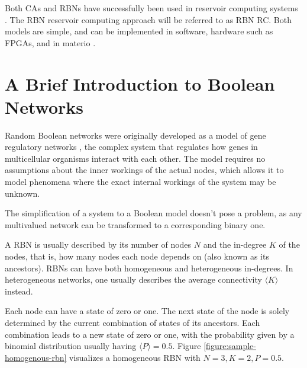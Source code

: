 Both CAs and RBNs have successfully been used in reservoir computing systems \cite{yilmaz2014reservoir} \cite{rbn-reservoir}.
The RBN reservoir computing approach will be referred to as RBN RC.
Both models are simple, and can be implemented in software,
hardware such as FPGAs, and in materio \cite{miller2002evolution} \cite{farstad2015evolving}.

\section{A Brief Introduction to Boolean Networks}
\label{section:rbns}

Random Boolean networks were originally developed as a model of gene regulatory networks \cite{kauffman1969metabolic},
the complex system that regulates how genes in multicellular organisms interact with each other.
The model requires no assumptions about the inner workings of the actual nodes,
which allows it to model phenomena where the exact internal workings of the system may be unknown.

The simplification of a system to a Boolean model doesn't pose a problem,
as any multivalued network can be transformed to a corresponding binary one.

A RBN is usually described by its number of nodes $N$ and the in-degree $K$ of the nodes,
that is, how many nodes each node depends on (also known as its ancestors).
RBNs can have both homogeneous and heterogeneous in-degrees.
In heterogeneous networks, one usually describes the average connectivity $\langle K \rangle$ instead.

Each node can have a state of zero or one.
The next state of the node is solely determined by the current combination of states of its ancestors.
Each combination leads to a new state of zero or one,
with the probability given by a binomial distribution usually having $\langle P \rangle = 0.5$.
Figure \ref{figure:sample-homogenous-rbn} visualizes a homogeneous RBN with $N=3, K=2, P=0.5$.

